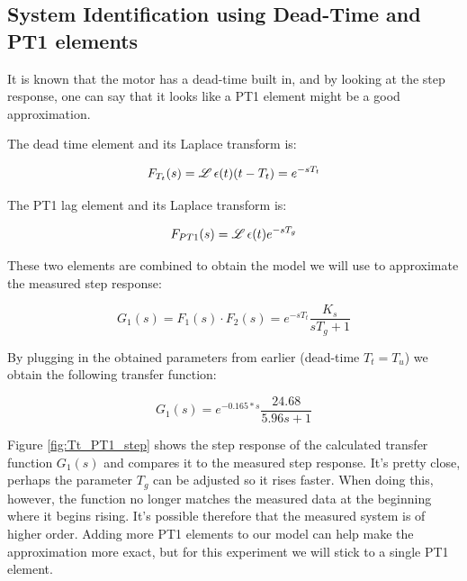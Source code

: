 \subsection{System Identification using Dead-Time and PT1 elements}

It  is  known  that the motor has a dead-time built in, and by looking at  the
step  response, one can say that it looks like a PT1 element might be  a  good
approximation.

The dead time element and its Laplace transform is:

\begin{equation}
    F_{T_t}(s) = \operatorname{\mathscr{L}}{\epsilon(t)(t-T_t)} = e^{-sT_t}
\end{equation}

The PT1 lag element and its Laplace transform is:

\begin{equation}
    F_{PT1}(s) = \operatorname{\mathscr{L}}{\epsilon(t)e^{-sT_g}}
\end{equation}

These two elements are combined to obtain the model we will use to approximate
the measured step response:

\begin{equation}
    G_1(s) = F_1(s) \cdot F_2(s) = e^{-sT_t} \frac{K_s}{sT_g+1}
\end{equation}

By plugging in the obtained parameters  from earlier (dead-time $T_t=T_u$)
we obtain the following transfer function:

\begin{equation}
    G_1(s) = e^{-0.165*s}\frac{24.68}{5.96s + 1}
\end{equation}

Figure  \ref{fig:Tt_PT1_step}  shows  the  step  response  of  the  calculated
transfer function $G_1(s)$ and compares it to the measured step response. It's
pretty  close, perhaps the parameter $T_g$ can be adjusted so it rises faster.
When doing this, however, the function no longer matches  the measured data at
the  beginning  where  it  begins  rising.  It's  possible therefore that  the
measured system  is of higher order. Adding more PT1 elements to our model can
help make the approximation more  exact, but for this experiment we will stick
to a single PT1 element.

